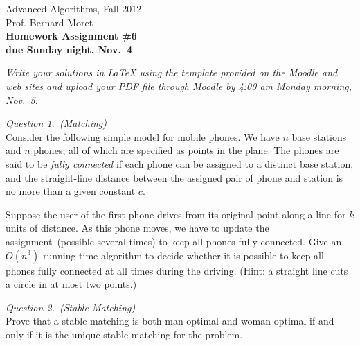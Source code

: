 \documentclass[11pt]{article}
\begin{document}
  \thispagestyle{empty}

\begin{center}
  \Large\sf Advanced Algorithms, Fall 2012\\
  
  \medskip
  \large\sf Prof. Bernard Moret\\

  \medskip\bigskip
  \Large\bf Homework Assignment \#6\\

  \smallskip
  \normalsize\rm due Sunday night, Nov.\ 4
\end{center}

\bigskip\rm\noindent
\textit{Write your solutions in LaTeX using the template provided on the
Moodle and web sites and upload your PDF file through Moodle by 4:00 am
Monday morning, Nov.\ 5.}


\bigskip\rm\noindent
\emph{Question 1.~(Matching)}\\
Consider the following simple model for mobile phones.
We have $n$ base stations and $n$ phones, all of which are specified as points
in the plane.  The phones are said to be \emph{fully connected} if each phone
can be assigned to a distinct base station, and the straight-line distance
between the assigned pair of phone and station is no more than a given
constant $c$.

Suppose the user of the first phone drives from its original point along a line
for $k$ units of distance.  As this phone moves, we have to update the
assignment~(possible several times) to keep all phones fully connected.  Give
an $O(n^3)$ running time algorithm to decide whether it is possible to keep all
phones fully connected at all times during the driving.  (Hint: a straight line
cuts a circle in at most two points.)


\bigskip\rm\noindent
\emph{Question 2.~(Stable Matching)}\\
Prove that a stable matching is both man-optimal and woman-optimal if and
only if it is the unique stable matching for the problem.
\end{document}
